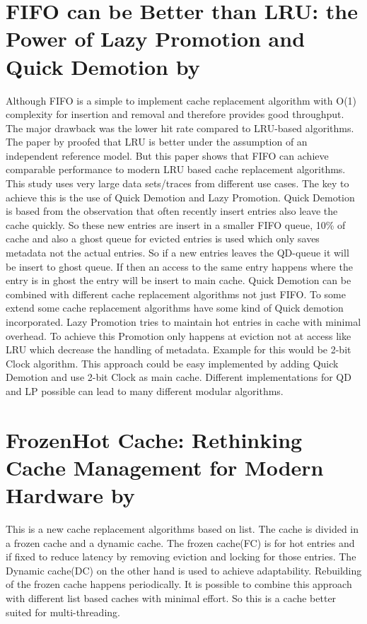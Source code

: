 \documentclass[
	12pt,
	a4paper,
	abstract,
	bibliography=totoc,
	chapterprefix,
	headings=openright,
	numbers=endperiod,
	parskip=half,
	twoside,
]{scrreprt}
\begin{document}
\section*{FIFO can be Better than LRU: the Power of Lazy Promotion and Quick Demotion by \cite{yang2023fifo}}

Although FIFO is a simple to implement cache replacement algorithm with O(1) complexity for insertion and removal and therefore provides good throughput.
The major drawback was the lower hit rate compared to LRU-based algorithms.
The paper by \cite{van1992lru} proofed that LRU is better under the assumption of an independent reference model.
But this paper \cite{yang2023fifo} shows that FIFO can achieve comparable performance to modern LRU based cache replacement algorithms.
This study uses very large data sets/traces from different use cases.
The key to achieve this is the use of Quick Demotion and Lazy Promotion.
Quick Demotion is based from the observation that often recently insert entries also leave the cache quickly. So these new entries are insert in a smaller FIFO queue, 10\% of cache and also a ghost queue for evicted entries is used which only saves metadata not the actual entries. So if a new entries leaves the QD-queue it will be insert to ghost queue. If then an access to the same entry happens where the entry is in ghost the entry will be insert to main cache.
Quick Demotion can be combined with different cache replacement algorithms not just FIFO.
To some extend some cache replacement algorithms have some kind of  Quick demotion incorporated. 
Lazy Promotion tries to maintain hot entries in cache with minimal overhead.
To achieve this Promotion only happens at eviction not at access like LRU which decrease the handling of metadata. Example for this would be 2-bit Clock algorithm.
This approach could be easy implemented by adding Quick Demotion and use 2-bit Clock as main cache.
Different implementations for QD and LP possible can lead to many different modular algorithms. 

\section*{FrozenHot Cache: Rethinking Cache Management for Modern Hardware by \cite{qiu2023frozenhot}}

This is a new cache replacement algorithms based on list.
The cache is divided in a frozen cache and a dynamic cache.
The frozen cache(FC) is for hot entries and if fixed to reduce latency by removing eviction and locking for those entries. 
The Dynamic cache(DC) on the other hand is used to achieve adaptability.
Rebuilding of the frozen cache happens periodically.
It is possible to combine this approach with different list based caches with minimal effort.
So this is a cache better suited for multi-threading.
\end{document}

